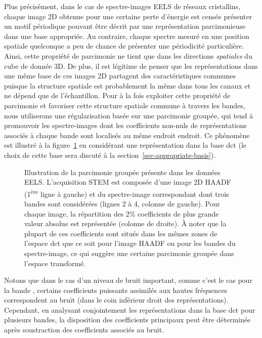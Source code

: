 Plus précisément, dans le cas de spectre-images EELS de réseaux cristallins, chaque image 2D obtenue pour une certaine perte d'énergie est censée présenter un motif périodique pouvant être décrit par une représentation parcimonieuse dans une base appropriée. Au contraire, chaque spectre mesuré en une position spatiale quelconque a peu de chance de présenter une périodicité particulière. Ainsi, cette propriété de parcimonie ne tient que dans les directions \emph{spatiales} du cube de donnée 3D.
%
De plus, il est légitime de penser que les représentations dans une même base de ces images 2D partagent des caractéristiques communes puisque la structure spatiale est probablement la même dans tous les canaux et ne dépend que de l'échantillon. Pour à la fois exploiter cette propriété de parcimonie et favoriser cette structure spatiale commune à travers les bandes, nous utiliserons une régularisation basée sur une parcimonie groupée, qui tend à promouvoir les spectre-images dont les coefficients non-nuls de représentations
associés à chaque bande sont localisés au même endroit endroit.
%
Ce phénomène est illustré à la figure~\ref{fig-joint-sparsity} en considérant une représentation dans la base \gls{dct} (le choix de cette base sera discuté à la section~\ref{sec-appropriate-basis}).
\begin{figure}[t]
    \centering
    
    \caption{\protect\label{fig-joint-sparsity}
        Illustration de la parcimonie groupée présente dans les données EELS. L'acquisition STEM est composée d'une image 2D HAADF  (1\textsuperscript{ère} ligne à gauche) et du spectre-image correspondant dont trois bandes sont considérées (lignes 2 à 4, colonne de gauche). Pour chaque image, la répartition des 2\% coefficients de plus grande valeur absolue est représentée (colonne de droite). 
        \`A noter que la plupart de ces coefficients sont situés dans les mêmes zones de l'espace \gls{dct} que ce soit pour l'image HAADF ou pour les bandes du spectre-image, ce qui suggère une certaine parcimonie groupée dans l'espace transformé.}
\end{figure}
Notons que dans le cas d'un niveau de bruit important, comme c'est le cas pour la bande \num{} , certains coefficients puissants assimilés aux hautes fréquences correspondent au bruit (dans le coin inférieur droit des représentations). Cependant, en analysant conjointement les représentations dans la base \gls{dct} pour plusieurs bandes, la disposition des coefficients principaux peut être déterminée après soustraction des coefficients associés au bruit.

